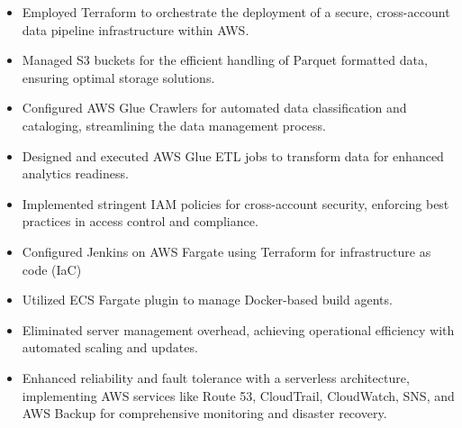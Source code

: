 \documentclass[10pt,a4paper,ragged2e,withhyper]{altacv}
\begin{document}
\vspace{10pt}

\begin{itemize}
    \item Employed Terraform to orchestrate the deployment of a secure, cross-account data pipeline infrastructure within AWS.
    \item Managed S3 buckets for the efficient handling of Parquet formatted data, ensuring optimal storage solutions.
    \item Configured AWS Glue Crawlers for automated data classification and cataloging, streamlining the data management process.
    \item Designed and executed AWS Glue ETL jobs to transform data for enhanced analytics readiness.
    \item Implemented stringent IAM policies for cross-account security, enforcing best practices in access control and compliance.
\end{itemize}

\vspace{10pt}

\begin{itemize}
    \item Configured Jenkins on AWS Fargate using Terraform for infrastructure as code (IaC)
    \item Utilized ECS Fargate plugin to manage Docker-based build agents.
    \item Eliminated server management overhead, achieving operational efficiency with automated scaling and updates.
    \item Enhanced reliability and fault tolerance with a serverless architecture, implementing AWS services like Route 53, CloudTrail, CloudWatch, SNS, and AWS Backup for comprehensive monitoring and disaster recovery.
\end{itemize}
\end{document}
